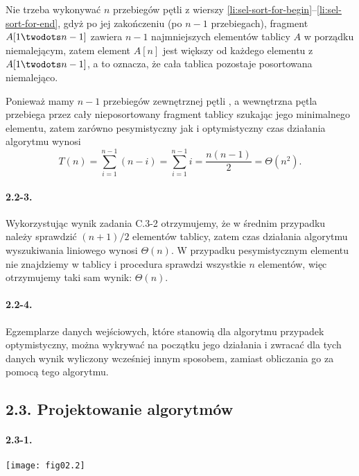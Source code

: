 Nie trzeba wykonywać $n$ przebiegów pętli  z wierszy \ref{li:sel-sort-for-begin}--\ref{li:sel-sort-for-end}, gdyż po jej zakończeniu (po $n-1$ przebiegach), fragment $A[1\twodots n-1]$ zawiera $n-1$ najmniejszych elementów tablicy $A$ w porządku niemalejącym, zatem element $A[n]$ jest większy od każdego elementu z $A[1\twodots n-1]$, a to oznacza, że cała tablica pozostaje posortowana niemalejąco.

Ponieważ mamy $n-1$ przebiegów zewnętrznej pętli , a wewnętrzna pętla  przebiega przez cały nieposortowany fragment tablicy szukając jego minimalnego elementu, zatem zarówno pesymistyczny jak i optymistyczny czas działania algorytmu wynosi
\[
	T(n) = \sum_{i=1}^{n-1}(n-i) = \sum_{i=1}^{n-1}i = \frac{n(n-1)}{2} = \Theta(n^2).
\]

\paragraph{2.2-3.}
Wykorzystując wynik zadania C.3-2 otrzymujemy, że w średnim przypadku należy sprawdzić $(n+1)/2$ elementów tablicy, zatem czas działania algorytmu wyszukiwania liniowego wynosi $\Theta(n)$. W przypadku pesymistycznym elementu nie znajdziemy w tablicy i procedura sprawdzi wszystkie $n$ elementów, więc otrzymujemy taki sam wynik: $\Theta(n)$.

\paragraph{2.2-4.}
Egzemplarze danych wejściowych, które stanowią dla algorytmu przypadek optymistyczny, można wykrywać na początku jego działania i zwracać dla tych danych wynik wyliczony wcześniej innym sposobem, zamiast obliczania go za pomocą tego algorytmu.

\subsection*{2.3. Projektowanie algorytmów}

\paragraph{2.3-1.}
	\begin{center}
		\texttt{[image: fig02.2]}
	\end{center}

